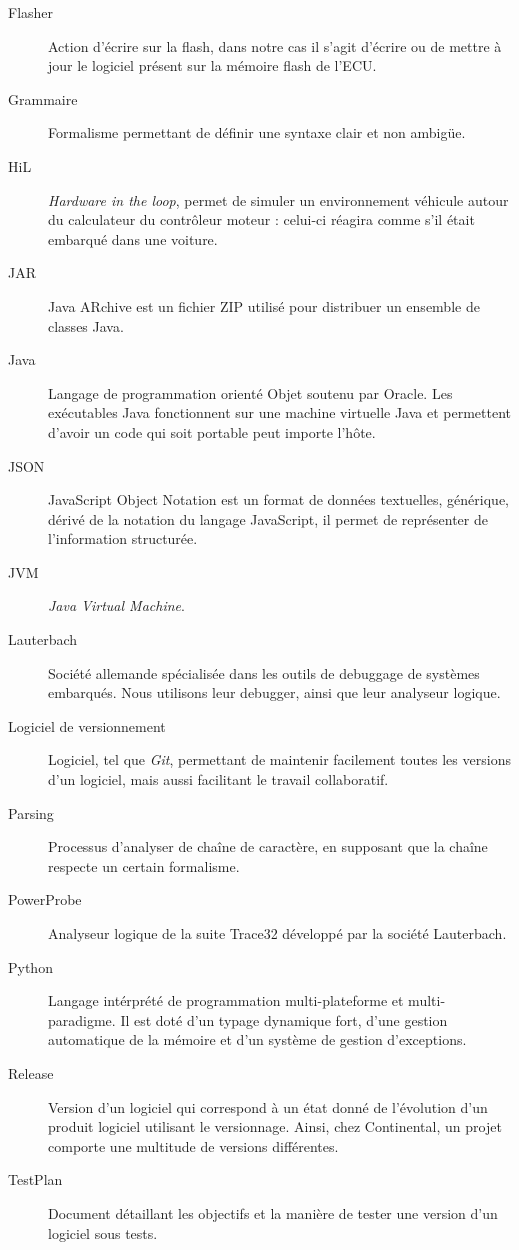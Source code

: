 \begin{description}
\item[Flasher] Action d'écrire sur la flash, dans notre cas il s'agit d'écrire ou de mettre à jour le logiciel présent sur la mémoire flash de l'ECU.
\item[Grammaire] Formalisme permettant de définir une syntaxe clair et non ambigüe.
\item[HiL] \textit{Hardware in the loop}, permet de simuler un environnement véhicule autour du calculateur du contrôleur moteur : celui-ci réagira comme s'il était embarqué dans une voiture.
\item[JAR] Java ARchive est un fichier ZIP utilisé pour distribuer un ensemble de classes Java.
\item[Java] Langage de programmation orienté Objet soutenu par Oracle. Les exécutables Java fonctionnent sur une machine virtuelle Java et permettent d'avoir un
	code qui soit portable peut importe l'hôte.
\item[JSON] JavaScript Object Notation est un format de données textuelles, générique, dérivé de la notation du langage JavaScript, il permet de représenter de
	l'information structurée.
\item[JVM] \textit{Java Virtual Machine}.
\item[Lauterbach] Société allemande spécialisée dans les outils de debuggage de systèmes embarqués. Nous utilisons leur debugger, ainsi que leur analyseur logique.
\item[Logiciel de versionnement] Logiciel, tel que \textit{Git}, permettant de maintenir facilement toutes les versions d'un logiciel, mais aussi facilitant le
	travail collaboratif.
\item[Parsing] Processus d'analyser de chaîne de caractère, en supposant que la chaîne respecte un certain formalisme. 
\item[PowerProbe] Analyseur logique de la suite Trace32 développé par la société Lauterbach.
\item[Python] Langage intérprété de programmation multi-plateforme et multi-paradigme. Il est doté d'un typage dynamique fort, d'une gestion automatique de la mémoire et d'un système de gestion d'exceptions. 
\item[Release] Version d'un logiciel qui correspond à un état donné de l'évolution d'un produit logiciel utilisant le versionnage. Ainsi, chez Continental, un projet comporte une multitude de versions différentes.
\item[TestPlan] Document détaillant les objectifs et la manière de tester une version d'un logiciel sous tests.

\end{description}
